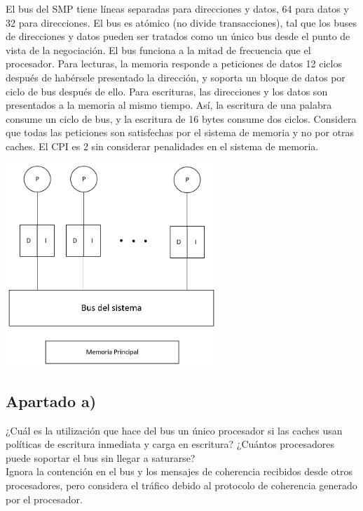 \documentclass[12pt,a4paper]{article}
\begin{document}
El bus del SMP tiene líneas separadas para direcciones y datos, 64 para datos y 32 para direcciones. El bus es atómico (no divide transacciones), tal que los buses de direcciones y datos pueden ser tratados como un único bus desde el punto de vista de la negociación. El bus funciona a la mitad de frecuencia que el procesador. Para lecturas, la memoria responde a peticiones de datos 12 ciclos después de habérsele presentado la dirección, y soporta un bloque de datos por ciclo de bus después de ello. Para escrituras, las direcciones y los datos son presentados a la memoria al mismo tiempo. Así, la escritura de una palabra consume un ciclo de bus, y la escritura de 16 bytes consume dos ciclos. Considera que todas las peticiones son satisfechas por el sistema de memoria y no por otras caches. El CPI es 2 sin considerar penalidades en el sistema de memoria.\\

\begin{center}
	\includegraphics[width=0.6\textwidth]{diagrama.png}\par
\end{center}

\subsection{Apartado a)}

¿Cuál es la utilización que hace del bus un único procesador si las caches usan políticas de escritura inmediata y carga en escritura? ¿Cuántos procesadores puede soportar el bus sin llegar a saturarse?\\

Ignora la contención en el bus y los mensajes de coherencia recibidos desde otros procesadores, pero considera el tráfico debido al protocolo de coherencia generado por el procesador. 
\end{document}
